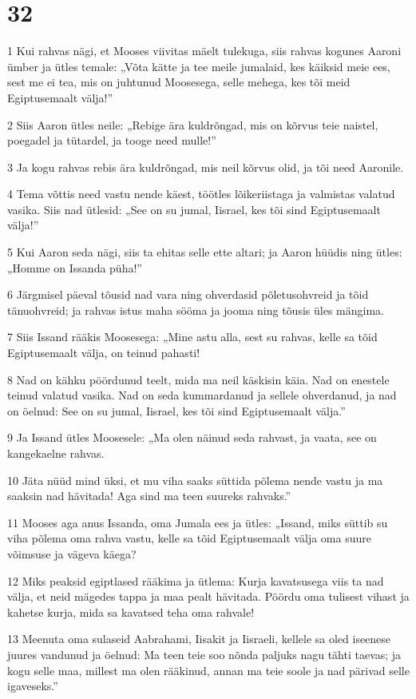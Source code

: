 \chapter{32}

\par 1 Kui rahvas nägi, et Mooses viivitas mäelt tulekuga, siis rahvas kogunes Aaroni ümber ja ütles temale: „Võta kätte ja tee meile jumalaid, kes käiksid meie ees, sest me ei tea, mis on juhtunud Moosesega, selle mehega, kes tõi meid Egiptusemaalt välja!”
\par 2 Siis Aaron ütles neile: „Rebige ära kuldrõngad, mis on kõrvus teie naistel, poegadel ja tütardel, ja tooge need mulle!”
\par 3 Ja kogu rahvas rebis ära kuldrõngad, mis neil kõrvus olid, ja tõi need Aaronile.
\par 4 Tema võttis need vastu nende käest, töötles lõikeriistaga ja valmistas valatud vasika. Siis nad ütlesid: „See on su jumal, Iisrael, kes tõi sind Egiptusemaalt välja!”
\par 5 Kui Aaron seda nägi, siis ta ehitas selle ette altari; ja Aaron hüüdis ning ütles: „Homme on Issanda püha!”
\par 6 Järgmisel päeval tõusid nad vara ning ohverdasid põletusohvreid ja tõid tänuohvreid; ja rahvas istus maha sööma ja jooma ning tõusis üles mängima.
\par 7 Siis Issand rääkis Moosesega: „Mine astu alla, sest su rahvas, kelle sa tõid Egiptusemaalt välja, on teinud pahasti!
\par 8 Nad on kähku pöördunud teelt, mida ma neil käskisin käia. Nad on enestele teinud valatud vasika. Nad on seda kummardanud ja sellele ohverdanud, ja nad on öelnud: See on su jumal, Iisrael, kes tõi sind Egiptusemaalt välja.”
\par 9 Ja Issand ütles Moosesele: „Ma olen näinud seda rahvast, ja vaata, see on kangekaelne rahvas.
\par 10 Jäta nüüd mind üksi, et mu viha saaks süttida põlema nende vastu ja ma saaksin nad hävitada! Aga sind ma teen suureks rahvaks.”
\par 11 Mooses aga anus Issanda, oma Jumala ees ja ütles: „Issand, miks süttib su viha põlema oma rahva vastu, kelle sa tõid Egiptusemaalt välja oma suure võimsuse ja vägeva käega?
\par 12 Miks peaksid egiptlased rääkima ja ütlema: Kurja kavatsusega viis ta nad välja, et neid mägedes tappa ja maa pealt hävitada. Pöördu oma tulisest vihast ja kahetse kurja, mida sa kavatsed teha oma rahvale!
\par 13 Meenuta oma sulaseid Aabrahami, Iisakit ja Iisraeli, kellele sa oled iseenese juures vandunud ja öelnud: Ma teen teie soo nõnda paljuks nagu tähti taevas; ja kogu selle maa, millest ma olen rääkinud, annan ma teie soole ja nad pärivad selle igaveseks.”
